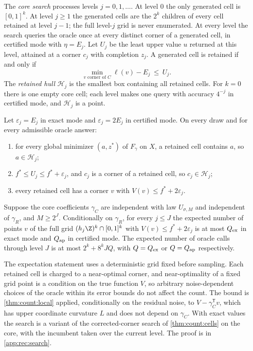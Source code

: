 The \emph{core search} processes levels $j=0,1,\ldots$. At level $0$ the
only generated cell is $[0,1]^k$. At level $j\ge1$ the generated cells are
the $2^k$ children of every cell retained at level $j-1$; the full level-$j$
grid is never enumerated. At every level the search queries the oracle once
at every distinct corner of a generated cell, in certified mode with
$\eta=E_j$. Let $U_j$ be the least upper value $u$ returned at this
level, attained at a corner $c_j$ with completion $z_j$. A generated cell is
retained if and only if
\begin{equation}\label{eq:rec:retain}
 \min_{v\text{ corner of }C}\ell(v)-E_j\ \le\ U_j .
\end{equation}
The \emph{retained hull} $\mathcal H_j$ is the smallest box containing all
retained cells. For $k=0$ there is one empty core cell; each level makes one
query with accuracy $4^{-j}$ in certified mode, and $\mathcal H_j$ is a point.

\begin{proposition}\label{prop:rec:search}
Let $\varepsilon_j=E_j$ in exact mode and $\varepsilon_j=2E_j$ in certified
mode. On every draw and for every admissible oracle answer:
\begin{enumerate}[label=(\alph*)]
\item for every global minimizer $(a,z^*)$ of $F_\gamma$ on $X$, a retained
cell contains $a$, so $a\in\mathcal H_j$;
\item $f^*\le U_j\le f^*+\varepsilon_j$, and $c_j$ is a corner of a retained
cell, so $c_j\in\mathcal H_j$;
\item every retained cell has a corner $v$ with $V(v)\le f^*+2\varepsilon_j$.
\end{enumerate}
Suppose the core coefficients $\gamma_C$ are independent with law
$U_{\sigma,M}$ and independent of $\gamma_R$, and $M\ge2^J$. Conditionally
on $\gamma_R$, for every $j\le J$ the expected number of points $v$ of the
full grid $(h_j\Z)^k\cap[0,1]^k$ with $V(v)\le f^*+2\varepsilon_j$ is at most
$Q_{\rm ex}$ in exact mode and $Q_{\rm ap}$ in certified mode. The expected
number of oracle calls through level $J$ is at most $2^k+8^kJQ$, with
$Q=Q_{\rm ex}$ or $Q=Q_{\rm ap}$ respectively.
\end{proposition}

The expectation statement uses a deterministic grid fixed before sampling.
Each retained cell is charged to a near-optimal corner, and near-optimality
of a fixed grid point is a condition on the true function $V$, so arbitrary
noise-dependent choices of the oracle within its error bounds do not affect
the count. The bound is \cref{thm:count:local} applied, conditionally on the
residual noise, to $V-\gamma_C^{\mathsf T}v$, which has upper coordinate
curvature $L$ and does not depend on $\gamma_C$. With exact values the search
is a variant of the corrected-corner search of \cref{thm:count:cells} on the
core, with the incumbent taken over the current level. The proof is in
\cref{app:rec:search}.

